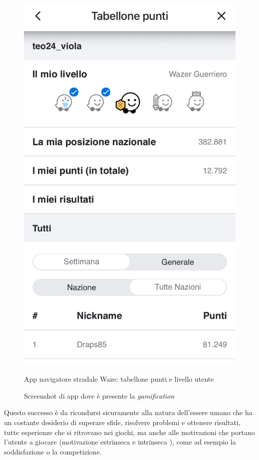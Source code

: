 \begin{figure}
\begin{minipage}[h]{0.4\linewidth}
        \includegraphics[width=1\textwidth]{img/waze2.jpeg}
        \caption{App navigatore stradale Waze: tabellone punti e livello utente}
        \label{fig:waze-level}
    \end{minipage}
    \caption{Screenshot di app dove è presente la \textit{gamification}} 
    \label{fig:gamification-example}
\end{figure}

Questo successo è da ricondursi sicuramente alla natura dell'essere umano che ha un costante desiderio di superare sfide, risolvere problemi e ottenere risultati, tutte esperienze che si ritrovano nei giochi, ma anche alle motivazioni che portano l'utente a giocare (motivazione estrinseca e intrinseca \cite{Deci1975IntrinsicMA}), come ad esempio la soddisfazione o la competizione.

